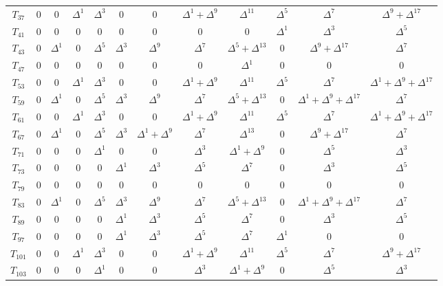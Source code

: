 \begin{center}
\begin{tabular}{|c|ccccccccccc|}
	$T_{37}$ & 0 & 0 & $\Delta^1$ & $\Delta^3$ & 0 & 0 & $\Delta^1 + \Delta^9$ & $\Delta^{11}$ & $\Delta^5$ & $\Delta^7$ & $\Delta^9 + \Delta^{17}$ \\
	$T_{41}$ & 0 & 0 & 0 & 0 & 0 & 0 & 0 & 0 & $\Delta^1$ & $\Delta^3$ & $\Delta^5$ \\
	$T_{43}$ & 0 & $\Delta^1$ & 0 & $\Delta^5$ & $\Delta^3$ & $\Delta^9$ & $\Delta^7$ & $\Delta^5 + \Delta^{13}$ & 0 & $\Delta^9 + \Delta^{17}$ & $\Delta^7$ \\
	$T_{47}$ & 0 & 0 & 0 & 0 & 0 & 0 & 0 & $\Delta^1$ & 0 & 0 & 0 \\
	$T_{53}$ & 0 & 0 & $\Delta^1$ & $\Delta^3$ & 0 & 0 & $\Delta^1 + \Delta^9$ & $\Delta^{11}$ & $\Delta^5$ & $\Delta^7$ & $\Delta^1 + \Delta^9 + \Delta^{17}$ \\
	$T_{59}$ & 0 & $\Delta^1$ & 0 & $\Delta^5$ & $\Delta^3$ & $\Delta^9$ & $\Delta^7$ & $\Delta^5 + \Delta^{13}$ & 0 & $\Delta^1 + \Delta^9 + \Delta^{17}$ & $\Delta^7$ \\
	$T_{61}$ & 0 & 0 & $\Delta^1$ & $\Delta^3$ & 0 & 0 & $\Delta^1 + \Delta^9$ & $\Delta^{11}$ & $\Delta^5$ & $\Delta^7$ & $\Delta^1 + \Delta^9 + \Delta^{17}$ \\
	$T_{67}$ & 0 & $\Delta^1$ & 0 & $\Delta^5$ & $\Delta^3$ & $\Delta^1 + \Delta^9$ & $\Delta^7$ & $\Delta^{13}$ & 0 & $\Delta^9 + \Delta^{17}$ & $\Delta^7$ \\
	$T_{71}$ & 0 & 0 & 0 & $\Delta^1$ & 0 & 0 & $\Delta^3$ & $\Delta^1 + \Delta^9$ & 0 & $\Delta^5$ & $\Delta^3$ \\
	$T_{73}$ & 0 & 0 & 0 & 0 & $\Delta^1$ & $\Delta^3$ & $\Delta^5$ & $\Delta^7$ & 0 & $\Delta^3$ & $\Delta^5$ \\
	$T_{79}$ & 0 & 0 & 0 & 0 & 0 & 0 & 0 & 0 & 0 & 0 & 0 \\
	$T_{83}$ & 0 & $\Delta^1$ & 0 & $\Delta^5$ & $\Delta^3$ & $\Delta^9$ & $\Delta^7$ & $\Delta^5 + \Delta^{13}$ & 0 & $\Delta^1 + \Delta^9 + \Delta^{17}$ & $\Delta^7$ \\
	$T_{89}$ & 0 & 0 & 0 & 0 & $\Delta^1$ & $\Delta^3$ & $\Delta^5$ & $\Delta^7$ & 0 & $\Delta^3$ & $\Delta^5$ \\
	$T_{97}$ & 0 & 0 & 0 & 0 & $\Delta^1$ & $\Delta^3$ & $\Delta^5$ & $\Delta^7$ & $\Delta^1$ & 0 & 0 \\
	$T_{101}$ & 0 & 0 & $\Delta^1$ & $\Delta^3$ & 0 & 0 & $\Delta^1 + \Delta^9$ & $\Delta^{11}$ & $\Delta^5$ & $\Delta^7$ & $\Delta^9 + \Delta^{17}$ \\
	$T_{103}$ & 0 & 0 & 0 & $\Delta^1$ & 0 & 0 & $\Delta^3$ & $\Delta^1 + \Delta^9$ & 0 & $\Delta^5$ & $\Delta^3$ \\

\end{tabular}
\end{center}
